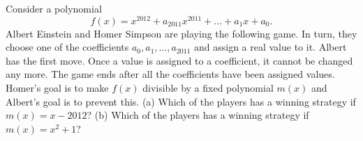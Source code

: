 Consider a polynomial
\[f(x)=x^{2012}+a_{2011}x^{2011}+\dots+a_1x+a_0.\]
Albert Einstein and Homer Simpson are playing the following game. In turn, they choose one of the coefficients $a_0,a_1,\dots,a_{2011}$ and assign a real value to it. Albert has the first move. Once a value is assigned to a coefficient, it cannot be changed any more. The game ends after all the coefficients have been assigned values.
Homer's goal is to make $f(x)$ divisible by a fixed polynomial $m(x)$ and Albert's goal is to prevent this.
(a) Which of the players has a winning strategy if $m(x)=x-2012$?
(b) Which of the players has a winning strategy if $m(x)=x^2+1$?

